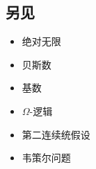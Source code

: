 \subsection{另见}  
\begin{itemize}
\item 绝对无限  
\item 贝斯数  
\item 基数  
\item \( \Omega \)-逻辑  
\item 第二连续统假设  
\item 韦策尔问题
\end{itemize}

